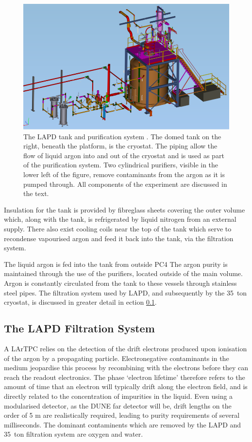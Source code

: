 \begin{figure}[ht]
  \centering
  \includegraphics[width=15cm]{LAPDTankPiping.png}
  \caption[LAPD tank and purification system]{The LAPD tank and purification system \cite{LAPD}.  The domed tank on the right, beneath the platform, is the cryostat.  The piping allow the flow of liquid argon into and out of the cryostat and is used as part of the purification system.  Two cylindrical purifiers, visible in the lower left of the figure, remove contaminants from the argon as it is pumped through.  All components of the experiment are discussed in the text.}
  \label{fig:LAPDTankPiping}
\end{figure}

Insulation for the tank is provided by fibreglass sheets covering the outer volume which, along with the tank, is refrigerated by liquid nitrogen from an external supply.  There also exist cooling coils near the top of the tank which serve to recondense vapourised argon and feed it back into the tank, via the filtration system.

The liquid argon is fed into the tank from outside PC4  The argon purity is maintained through the use of the purifiers, located outside of the main volume.  Argon is constantly circulated from the tank to these vessels through stainless steel pipes.  The filtration system used by LAPD, and subsequently by the 35~ton cryostat, is discussed in greater detail in ection \ref{sec:LAPDFiltration}.

\subsection{The LAPD Filtration System}\label{sec:LAPDFiltration}

A LArTPC relies on the detection of the drift electrons produced upon ionisation of the argon by a propagating particle.  Electronegative contaminants in the medium jeopardise this process by recombining with the electrons before they can reach the readout electronics.  The phase `electron lifetime' therefore refers to the amount of time that an electron will typically drift along the electron field, and is directly related to the concentration of impurities in the liquid.  Even using a modularised detector, as the DUNE far detector will be, drift lengths on the order of 5 m are realistically required, leading to purity requirements of several milliseconds.  The dominant contaminents which are removed by the LAPD and 35~ton filtration system are oxygen and water.

